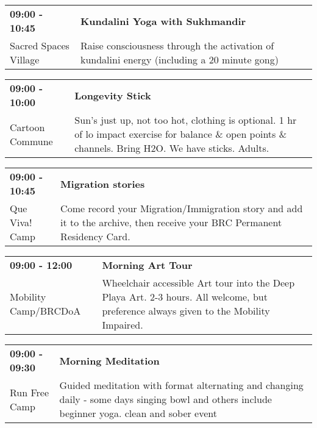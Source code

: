 \begin{tabular}{ p{1in} p{2.2in} }
    \textbf{09:00 - 10:45} & \textbf{Kundalini Yoga with Sukhmandir} \\
    Sacred Spaces Village \newline  & Raise consciousness through the activation of kundalini energy (including a 20 minute gong) \\
    \hline 
\end{tabular}
    
\begin{tabular}{ p{1in} p{2.2in} }
    \textbf{09:00 - 10:00} & \textbf{Longevity Stick} \\
    Cartoon Commune \newline  & Sun's just up, not too hot, clothing is optional. 1 hr of lo impact exercise for balance \& open points \& channels. Bring H2O. We have sticks. Adults. \\
    \hline 
\end{tabular}
    
\begin{tabular}{ p{1in} p{2.2in} }
    \textbf{09:00 - 10:45} & \textbf{Migration stories} \\
    Que Viva! Camp \newline  & Come record your Migration/Immigration story and add it to the archive, then receive your BRC Permanent Residency Card. \\
    \hline 
\end{tabular}
    
\begin{tabular}{ p{1in} p{2.2in} }
    \textbf{09:00 - 12:00} & \textbf{Morning Art Tour} \\
    Mobility Camp/BRCDoA \newline  & Wheelchair accessible Art tour into the Deep Playa Art.
2-3 hours. All welcome, but preference always given to the Mobility Impaired. \\
    \hline 
\end{tabular}
    
\begin{tabular}{ p{1in} p{2.2in} }
    \textbf{09:00 - 09:30} & \textbf{Morning Meditation} \\
    Run Free Camp \newline  & Guided meditation with format alternating and changing daily - some days singing bowl and others include beginner yoga. clean and sober event \\
    \hline 
\end{tabular}
    
